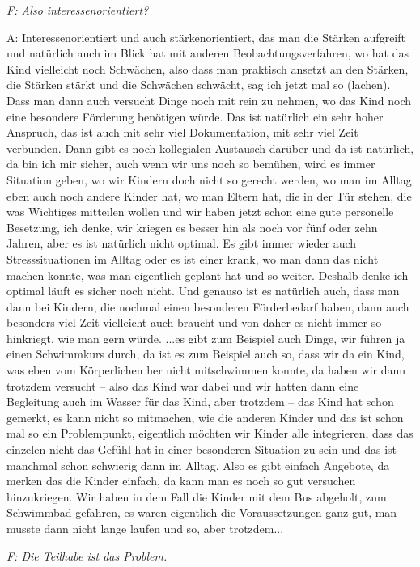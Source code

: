 \emph{F: Also interessenorientiert?}

A: Interessenorientiert und auch stärkenorientiert, das man die Stärken aufgreift und natürlich auch im Blick hat mit anderen Beobachtungsverfahren, wo hat das Kind vielleicht noch Schwächen, also dass man praktisch ansetzt an den Stärken, die Stärken stärkt und die Schwächen schwächt, sag ich jetzt mal so (lachen). Dass man dann auch versucht Dinge noch mit rein zu nehmen, wo das Kind noch eine besondere Förderung benötigen würde. Das ist natürlich ein sehr hoher Anspruch, das ist auch mit sehr viel Dokumentation, mit sehr viel Zeit verbunden. Dann gibt es noch kollegialen Austausch darüber und da ist natürlich, da bin ich mir sicher, auch wenn wir uns noch so bemühen, wird es immer Situation geben, wo wir Kindern doch nicht so gerecht werden, wo man im Alltag eben auch noch andere Kinder hat, wo man Eltern hat, die in der Tür stehen, die was Wichtiges mitteilen wollen und wir haben jetzt schon eine gute personelle Besetzung, ich denke, wir kriegen es besser hin als noch vor fünf oder zehn Jahren, aber es ist natürlich nicht optimal. Es gibt immer wieder auch Stresssituationen im Alltag oder es ist einer krank, wo man dann das nicht machen konnte, was man eigentlich geplant hat und so weiter. Deshalb denke ich optimal läuft es sicher noch nicht. Und genauso ist es natürlich auch, dass man dann bei Kindern, die nochmal einen besonderen Förderbedarf haben, dann auch besonders viel Zeit vielleicht auch braucht und von daher es nicht immer so hinkriegt, wie man gern würde. ...es gibt zum Beispiel auch Dinge, wir führen ja einen Schwimmkurs durch, da ist es zum Beispiel auch so, dass wir da ein Kind, was eben vom Körperlichen her nicht mitschwimmen konnte, da haben wir dann trotzdem versucht – also das Kind war dabei und wir hatten dann eine Begleitung auch im Wasser für das Kind, aber trotzdem – das Kind hat schon gemerkt, es kann nicht so mitmachen, wie die anderen Kinder und das ist schon mal so ein Problempunkt, eigentlich möchten wir Kinder alle integrieren, dass das einzelen nicht das Gefühl hat in einer besonderen Situation zu sein und das ist manchmal schon schwierig dann im Alltag. Also es gibt einfach Angebote, da merken das die Kinder einfach, da kann man es noch so gut versuchen hinzukriegen. Wir haben in dem Fall die Kinder mit dem Bus abgeholt, zum Schwimmbad gefahren, es waren eigentlich die Voraussetzungen ganz gut, man musste dann nicht lange laufen und so, aber trotzdem...

\emph{F: Die Teilhabe ist das Problem.}

